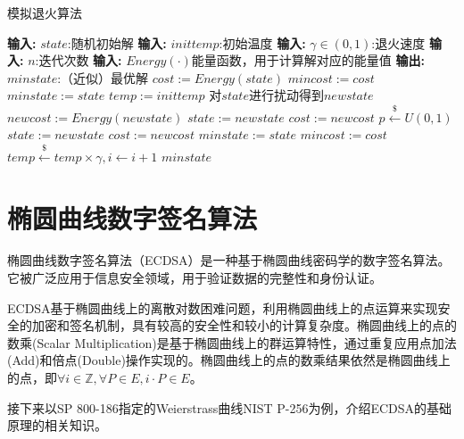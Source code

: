 {	\begin{breakablealgorithm}%
		\caption{模拟退火算法}\label{alg:sa}
		\begin{algorithmic}[1]
			\Statex \textbf{输入:} $state$:随机初始解
			\Statex \textbf{输入:} $inittemp$:初始温度
			\Statex \textbf{输入:} $\gamma\in(0,1)$:退火速度
			\Statex \textbf{输入:} $n$:迭代次数
			\Statex \textbf{输入:} $Energy(\cdot)$能量函数，用于计算解对应的能量值
			\Statex \textbf{输出:} $minstate$:（近似）最优解
			\State $cost := Energy(state)$
			\State $mincost:=cost$
			\State $minstate:=state$
			\State $temp:=inittemp$
				\Repeat
					\State 对$state$进行扰动得到$newstate$
					\State $newcost:=Energy(newstate)$
						\State $state:= newstate$
						\State $cost:= newcost$
					\Else
						\State $p\stackrel{\$}\gets U(0,1)$
							\State $state:= newstate$
							\State$cost:= newcost$
						\EndIf
					\EndIf
						\State $minstate:= state$
						\State $mincost:= cost$
					\EndIf
				\State $temp\stackrel{\$}\gets temp\times\gamma,i\gets i+1$
			\EndFor
			\State \Return $minstate$
		\end{algorithmic}
	\end{breakablealgorithm}

	\section{椭圆曲线数字签名算法}\label{sec:ecdsa}
	椭圆曲线数字签名算法（ECDSA）是一种基于椭圆曲线密码学的数字签名算法。它被广泛应用于信息安全领域，用于验证数据的完整性和身份认证。
	
	ECDSA基于椭圆曲线上的离散对数困难问题，利用椭圆曲线上的点运算来实现安全的加密和签名机制，具有较高的安全性和较小的计算复杂度。椭圆曲线上的点的数乘(Scalar Multiplication)是基于椭圆曲线上的群运算特性，通过重复应用点加法(Add)和倍点(Double)操作实现的。椭圆曲线上的点的数乘结果依然是椭圆曲线上的点，即$\forall i\in\mathbb Z,\forall P\in E, i\cdot P\in E$。
	
	接下来以SP 800-186\citep{SP800-186}指定的Weierstrass曲线NIST P-256为例，介绍ECDSA的基础原理的相关知识。
	
}
